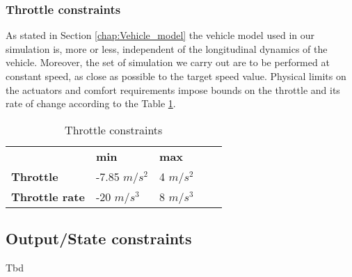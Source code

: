 \subsubsection{Throttle constraints}
As stated in Section \ref{chap:Vehicle_model} the vehicle model used in our simulation is,  more or less, independent of the longitudinal dynamics of the vehicle. Moreover, the set of simulation we carry out are to be performed at constant speed, as close as possible to the target speed value. 
Physical limits on the actuators and comfort requirements impose bounds on the throttle and its rate of change according to the Table \ref{tab:throttle}.

\begin{table}[H]
\begin{center}
\begin{tabular}{lllll}
\cline{2-3}
\multicolumn{1}{l|}{} & \multicolumn{1}{l|}{\textbf{min}} & \multicolumn{1}{l|}{\textbf{max}} &  &  \\ \cline{1-3}
\multicolumn{1}{|l|}{\textbf{Throttle}} & \multicolumn{1}{l|}{-7.85 $m/s^2$}  & \multicolumn{1}{l|}{4 $m/s^2$} &  &  \\ \cline{1-3}
\multicolumn{1}{|l|}{\textbf{Throttle rate}} & \multicolumn{1}{l|}{-20 $m/s^3$}    & \multicolumn{1}{l|}{8 $m/s^3$} &  &  \\ \cline{1-3}
\end{tabular}
\caption{Throttle constraints}
\label{tab:throttle}
\end{center}
\end{table}

\subsection{Output/State constraints} Tbd
